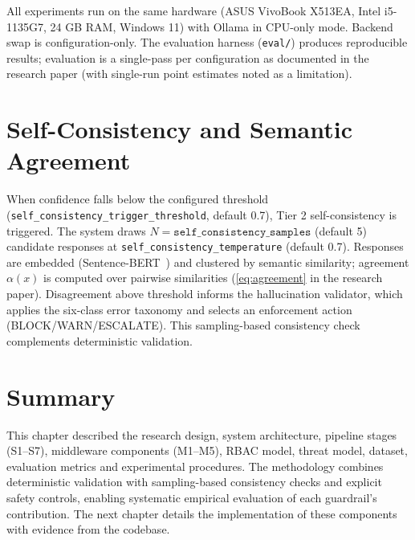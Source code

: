 All experiments run on the same hardware (ASUS VivoBook X513EA, Intel i5-1135G7, 24 GB RAM, Windows 11) with Ollama in CPU-only mode. Backend swap is configuration-only. The evaluation harness (\texttt{eval/}) produces reproducible results; evaluation is a single-pass per configuration as documented in the research paper (with single-run point estimates noted as a limitation).

\section{Self-Consistency and Semantic Agreement}\label{sec:method-selfconsistency}

When confidence falls below the configured threshold (\texttt{self\_consistency\_trigger\_threshold}, default 0.7), Tier 2 self-consistency is triggered. The system draws $N=\texttt{self\_consistency\_samples}$ (default 5) candidate responses at \texttt{self\_consistency\_temperature} (default 0.7). Responses are embedded (Sentence-BERT~\cite{reimers2019sbert}) and clustered by semantic similarity; agreement $\alpha(x)$ is computed over pairwise similarities (\cref{eq:agreement} in the research paper). Disagreement above threshold informs the hallucination validator, which applies the six-class error taxonomy and selects an enforcement action (BLOCK/WARN/ESCALATE). This sampling-based consistency check complements deterministic validation.

\section{Summary}\label{sec:method-summary}

This chapter described the research design, system architecture, pipeline stages (S1--S7), middleware components (M1--M5), RBAC model, threat model, dataset, evaluation metrics and experimental procedures. The methodology combines deterministic validation with sampling-based consistency checks and explicit safety controls, enabling systematic empirical evaluation of each guardrail's contribution. The next chapter details the implementation of these components with evidence from the codebase.
